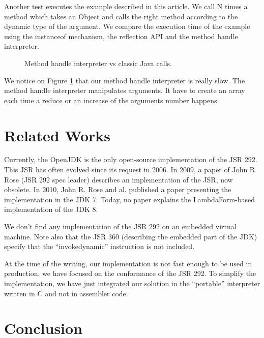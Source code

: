 \documentclass{sig-alternate}
\def \Jsr{JSR\xspace}
\def \JSR{\Jsr 292\xspace}
\begin{document}
  Another test executes the example described in this article.
  We call N times a method which takes an Object and calls the right method according to the dynamic type of the argument.
  We compare the execution time of the example using the instanceof mechanism, the reflection API and the method handle interpreter.

  \begin{figure}[!h]
    \resizebox{\linewidth}{!}{}
    \caption{Method handle interpreter vs classic Java calls.}\vspace{-1em}
    \label{Rmutable}
  \end{figure}

  We notice on Figure \ref{Rmutable} that our method handle interpreter is really slow.
  The method handle interpreter manipulates arguments.
  It have to create an array each time a reduce or an increase of the arguments number happens.

\section{Related Works}

  Currently, the OpenJDK is the only open-source implementation of the \JSR.
  This JSR has often evolved since its request in 2006\cite{jcp-jsr-292}.
  In 2009, a paper of John R. Rose (\JSR spec leader) describes an implementation of the \Jsr, now obsolete\cite{vmil-rose-indy-2009}.
  In 2010, John R. Rose and al. published a paper presenting the implementation in the JDK 7\cite{pppj-rose-indy-2010}.
  Today, no paper explains the LambdaForm-based implementation of the JDK 8.

  We don't find any implementation of the \JSR on an embedded virtual machine.
  Note also that the \Jsr 360 (describing the embedded part of the JDK) specify that the ``invokedynamic'' instruction is not included\cite{jcp-jsr-360}.



  At the time of the writing, our implementation is not fast enough to be used in production, we have focused on the conformance of the \JSR.
  To simplify the implementation, we have just integrated our solution in the ``portable'' interpreter written in C and not in assembler code.

\section{Conclusion}
\end{document}
